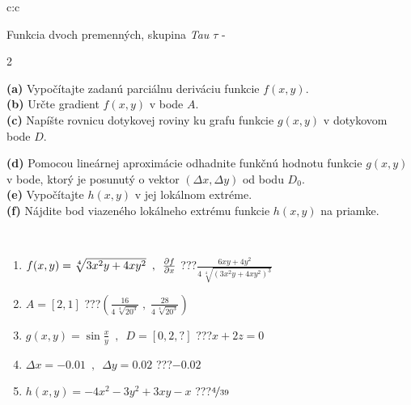 \documentclass[10pt]{report}
\begin{document}
\begin{tabular}{c:c}
\begin{minipage}[c][104.5mm][t]{0.5\linewidth}
\begin{center}
\vspace{7mm}
{\huge \LARGE Funkcia dvoch premenných, skupina \textit{Tau $\tau$} -}\\[5mm]
\begin{minipage}{0.95\linewidth}
\begin{center}
{\small \begin{multicols}{2} \raggedright
\textbf{(a)} Vypočítajte zadanú parciálnu deriváciu funkcie \(f(x,y)\). \\[1mm]
\textbf{(b)} Určte gradient \(f(x,y)\) v bode \(A\). \\[1mm]
\textbf{(c)} Napíšte rovnicu dotykovej roviny ku grafu funkcie \(g(x,y)\) v dotykovom bode \(D\). \par \columnbreak
\textbf{(d)} Pomocou lineárnej aproximácie odhadnite funkčnú hodnotu funkcie \(g(x,y)\) v bode, ktorý je posunutý o vektor \((\Delta x, \Delta y)\) od bodu \(D_0\). \\[1mm]
\textbf{(e)} Vypočítajte \(h(x,y)\) v jej lokálnom extréme. \\[1mm]
\textbf{(f)} Nájdite bod viazeného lokálneho extrému funkcie \(h(x,y)\) na priamke. \\[1mm]
\end{multicols}
}
\end{center}
\end{minipage}
\\[4mm]
\begin{minipage}{0.79\linewidth}
\begin{center}
\begin{varwidth}{\linewidth}
\begin{enumerate}
\normalsizerr
\item $f(x,y) = \sqrt[4]{3x^2y + 4xy^2}\enspace , \enspace \pdv{f}{x}$\quad \dotfill\; ???\;\dotfill \quad $\frac{6xy+4y^2}{4\,\sqrt[4]{(3x^2y+4xy^2)^{3}}}$
\item $A = [2, 1]$\quad \dotfill\; ???\;\dotfill \quad $\left( \frac{16}{4\,\sqrt[4]{20^3}} \;,\; \frac{28}{4\,\sqrt[4]{20^3}} \right)$
\item $g(x,y) = \sin\frac{x}{y} \enspace , \enspace D = [0, 2, ?]$\quad \dotfill\; ???\;\dotfill \quad $x+2z=0$
\item $\Delta x = {-0.01} \enspace,\enspace \Delta y = {0.02}$\quad \dotfill\; ???\;\dotfill \quad $-0.02$
\item $h(x,y) = -4x^2-3y^2+3xy-x$\quad \dotfill\; ???\;\dotfill \quad $\nicefrac{4}{39}$

\end{enumerate}
\end{varwidth}
\end{center}
\end{minipage}
\end{center}
\end{minipage}
\end{tabular}
\end{document}
